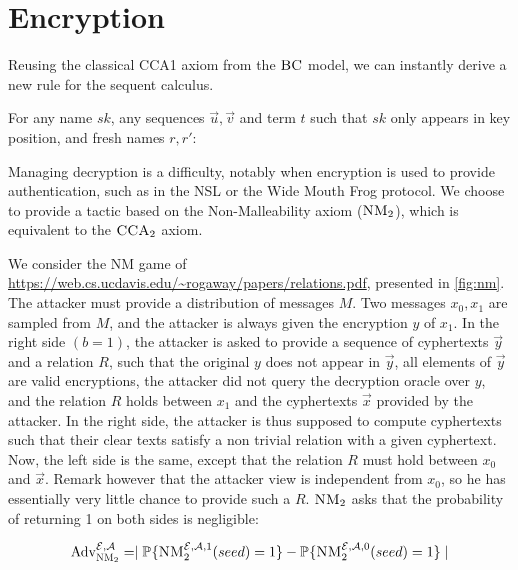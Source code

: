 \section{Encryption}


Reusing the classical CCA1 axiom from the $\BC$ model, we can instantly derive a new rule for the sequent calculus.

For any name $sk$, any sequences $\vec{u},\vec{v}$ and term $t$ such that $sk$ only appears in key position, and fresh names $r,r'$:

\begin{mathpar}
\end{mathpar}



Managing decryption is a difficulty, notably when encryption is used to provide authentication, such as in the NSL or the Wide Mouth Frog protocol. We choose to provide a tactic based on the Non-Malleability axiom ($\NM$), which is equivalent to the $\CCAtwo$ axiom.


We consider the NM game of \url{https://web.cs.ucdavis.edu/~rogaway/papers/relations.pdf}, presented in \cref{fig:nm}. The attacker must provide a distribution of messages $M$. Two messages $x_0,x_1$ are sampled from $M$, and the attacker is always given the encryption $y$ of $x_1$. In the right side $(b=1)$, the attacker is asked to provide a sequence of cyphertexts $\vec{y}$ and a relation $R$, such that the original $y$ does not appear in $\vec{y}$, all elements of $\vec{y}$ are valid encryptions, the attacker did not query the decryption oracle over $y$, and the relation $R$ holds between $x_1$ and the cyphertexts $\vec{x}$ provided by the attacker. In the right side, the attacker is thus supposed to compute cyphertexts such that their clear texts satisfy a non trivial relation with a given cyphertext. Now, the left side is the same, except that the relation $R$ must hold between $x_0$ and $\vec{x}$. Remark however that the attacker view is independent from $x_0$, so he has essentially very little chance to provide such a $R$. $\NM$ asks that the probability of returning 1 on both sides is negligible:

\[\Adv^{\mathcal{E},\A}_{\NM} = \mid \prob{}{\NM^{\mathcal{E},\A,1}(seed) = 1} -  \prob{}{\NM^{\mathcal{E},\A,0}(seed) = 1} \mid \]

